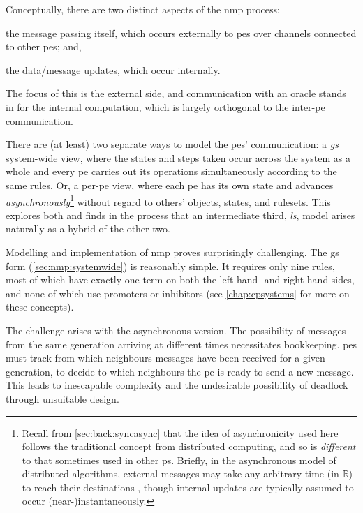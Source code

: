 Conceptually, there are two distinct aspects of the \gls{nmp} process:
\begin{inparaenum}
\item the message passing itself, which occurs externally to \glspl{pe} over channels connected to other \glspl{pe}; and,
\item the data/message updates, which occur internally.
\end{inparaenum}
The focus of this  is the external side, and communication with an oracle stands in for the internal computation, which is largely orthogonal to the inter-\gls{pe} communication.

There are (at least) two separate ways to model the \glspl{pe}' communication:  a \emph{\gls{gs}} system-wide view, where the states and steps taken occur across the system as a whole and every \gls{pe} carries out its operations simultaneously according to the same rules.  Or, a per-\gls{pe} view, where each \gls{pe} has its own state and advances \emph{asynchronously}\footnote{Recall from \vref{sec:back:syncasync} that the idea of asynchronicity used here follows the traditional concept from distributed computing, and so is \emph{different} to that sometimes used in other \gls{ps}.  Briefly, in the asynchronous model of distributed algorithms, external messages may take any arbitrary time (in \(\mathbb{R}\)) to reach their destinations \cite{Balanescu2011,Nicolescu2014,Lynch1996}, though internal updates are typically assumed to occur (near-)instantaneously.} without regard to others' objects, states, and rulesets.  This  explores both and finds in the process that an intermediate third, \emph{\gls{ls}}, model arises naturally as a hybrid of the other two.

Modelling and implementation of \gls{nmp} proves surprisingly challenging.  The \gls{gs} form (\cref{sec:nmp:systemwide}) is reasonably simple.  It requires only nine rules, most of which have exactly one term on both the left-hand- and right-hand-sides, and none of which use \glspl{promoter} or \glspl{inhibitor} (see \cref{chap:cpsystems} for more on these concepts).

The challenge arises with the asynchronous version.  The possibility of messages from the same generation arriving at different times necessitates bookkeeping.
\Glspl{pe} must track from which neighbours messages have been received for a given generation, to decide to which neighbours the \gls{pe} is ready to send a new message.
This leads to inescapable complexity and the undesirable possibility of deadlock through unsuitable design.

